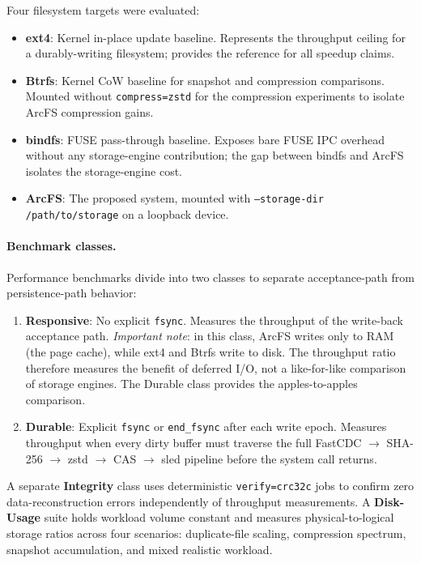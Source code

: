 \documentclass[5p,times]{elsarticle}
\begin{document}
Four filesystem targets were evaluated:
\begin{itemize}
\item \textbf{ext4}: Kernel in-place update baseline.  Represents the
  throughput ceiling for a durably-writing filesystem; provides the
  reference for all speedup claims.
\item \textbf{Btrfs}: Kernel CoW baseline for snapshot and compression
  comparisons.  Mounted without \texttt{compress=zstd} for the
  compression experiments to isolate ArcFS compression gains.
\item \textbf{bindfs}: FUSE pass-through baseline.  Exposes bare FUSE
  IPC overhead without any storage-engine contribution; the gap between
  bindfs and ArcFS isolates the storage-engine cost.
\item \textbf{ArcFS}: The proposed system, mounted with
  \texttt{--storage-dir /path/to/storage} on a loopback device.
\end{itemize}

\paragraph{Benchmark classes.}
Performance benchmarks divide into two classes to separate acceptance-path
from persistence-path behavior:
\begin{enumerate}
\item \textbf{Responsive}: No explicit \texttt{fsync}. Measures the
  throughput of the write-back acceptance path.  \emph{Important note}:
  in this class, ArcFS writes only to RAM (the page cache), while ext4
  and Btrfs write to disk.  The throughput ratio therefore measures the
  benefit of deferred I/O, not a like-for-like comparison of storage
  engines.  The Durable class provides the apples-to-apples comparison.
\item \textbf{Durable}: Explicit \texttt{fsync} or \texttt{end\_fsync}
  after each write epoch. Measures throughput when every dirty buffer
  must traverse the full FastCDC $\to$ SHA-256 $\to$ zstd $\to$ CAS
  $\to$ sled pipeline before the system call returns.
\end{enumerate}

A separate \textbf{Integrity} class uses deterministic
\texttt{verify=crc32c} jobs to confirm zero data-reconstruction errors
independently of throughput measurements. A \textbf{Disk-Usage} suite holds
workload volume constant and measures physical-to-logical storage ratios
across four scenarios: duplicate-file scaling, compression spectrum,
snapshot accumulation, and mixed realistic workload.
\end{document}
